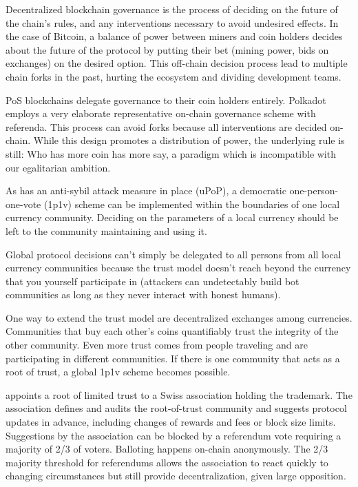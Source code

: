 \documentclass[conference]{IEEEtran}
\begin{document}
Decentralized blockchain governance is the process of deciding on the future of the chain's rules, and any interventions necessary to avoid undesired effects. In the case of Bitcoin, a balance of power between miners and coin holders decides about the future of the protocol by putting their bet (mining power, bids on exchanges) on the desired option. This off-chain decision process lead to multiple chain forks in the past, hurting the ecosystem and dividing development teams. 

PoS blockchains delegate governance to their coin holders entirely. Polkadot \cite{polkadot} employs a very elaborate representative on-chain governance scheme with referenda. This process can avoid forks because all interventions are decided on-chain. While this design promotes a distribution of power, the underlying rule is still: Who has more coin has more say, a paradigm which is incompatible with our egalitarian ambition.

As \encointer has an anti-sybil attack measure in place (uPoP), a democratic one-person-one-vote (1p1v) scheme can be implemented within the boundaries of one local currency community. Deciding on the parameters of a local currency should be left to the community maintaining and using it.

Global protocol decisions can't simply be delegated to all persons from all local currency communities because the trust model doesn't reach beyond the currency that you yourself participate in (attackers can undetectably build bot communities as long as they never interact with honest humans). 

One way to extend the trust model are decentralized exchanges among \encointer currencies. Communities that buy each other's coins quantifiably trust the integrity of the other community. Even more trust comes from people traveling and are participating in different communities. If there is one community that acts as a root of trust, a global 1p1v scheme becomes possible.

\encointer appoints a root of limited trust to a Swiss association holding the \encointer trademark. 
The association defines and audits the root-of-trust community and suggests protocol updates in advance, including changes of rewards and fees or block size limits. Suggestions by the association can be blocked by a referendum vote requiring a majority of 2/3 of voters. Balloting happens on-chain anonymously. The 2/3 majority threshold for referendums allows the association to react quickly to changing circumstances but still provide decentralization, given large opposition.
\end{document}

